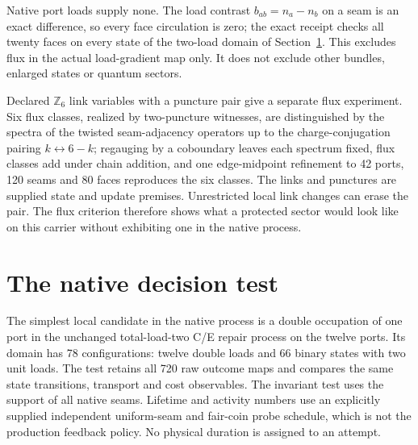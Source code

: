 \documentclass[11pt]{article}
\begin{document}
Native port loads supply none. The load contrast \(b_{ab}=n_a-n_b\) on a
seam is an exact difference, so every face circulation is zero; the exact
receipt checks all twenty faces on every state of the two-load domain of
Section~\ref{sec:native-decision}. This excludes flux in the actual
load-gradient map only. It does not exclude other bundles, enlarged states
or quantum sectors.

Declared \(\mathbb Z_6\) link variables with a puncture pair give a separate
flux experiment. Six flux classes, realized by two-puncture witnesses, are
distinguished by the spectra of the twisted seam-adjacency operators up to
the charge-conjugation pairing \(k\leftrightarrow6-k\); regauging by a
coboundary leaves each spectrum fixed, flux classes add under chain addition,
and one edge-midpoint refinement to 42 ports, 120 seams and 80 faces
reproduces the six classes. The links and punctures are supplied state and
update premises. Unrestricted local link changes can erase the pair. The
flux criterion therefore shows what a protected sector would look like on
this carrier without exhibiting one in the native process.

\section{The native decision test}
\label{sec:native-decision}

The simplest local candidate in the native process is a double occupation of
one port in the unchanged total-load-two C/E repair process on the twelve
ports. Its domain has 78 configurations: twelve double loads and 66 binary
states with two unit loads. The test retains all 720 raw outcome maps and
compares the same state transitions, transport and cost observables. The
invariant test uses the support of all native seams. Lifetime and activity
numbers use an explicitly supplied independent uniform-seam and fair-coin
probe schedule, which is not the production feedback policy. No physical
duration is assigned to an attempt.
\end{document}
